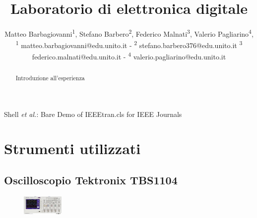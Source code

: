 \documentclass[journal]{IEEEtran}
\begin{document}
\title{Laboratorio di elettronica digitale\\ 
}

\author{\begin{center}Matteo Barbagiovanni\textsuperscript{1},
        Stefano Barbero\textsuperscript{2},
        Federico Malnati\textsuperscript{3},
        Valerio Pagliarino\textsuperscript{4},
        {\small \\
        \textsuperscript{1}
        matteo.barbagiovanni@edu.unito.it -
        \textsuperscript{2}
        stefano.barbero376@edu.unito.it
        \textsuperscript{3}
        federico.malnati@edu.unito.it -
        \textsuperscript{4}
        valerio.pagliarino@edu.unito.it}
        \end{center}}%
        
{Shell \MakeLowercase{\textit{et al.}}: Bare Demo of IEEEtran.cls for IEEE Journals}

\maketitle



\begin{abstract} 
Introduzione all'esperienza
\end{abstract}


\section{Strumenti utilizzati}

\subsection{\textbf{Oscilloscopio Tektronix TBS1104}}

\begin{figure}[h!]
  \centering
  \includegraphics[width=0.18\textwidth]{lab-reports/Schematics-and-graphics/TEK Osc.png}
\end{figure}
\end{document}

